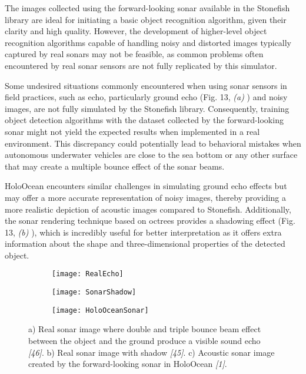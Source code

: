 \documentclass[]{article}
\begin{document}
	The images collected using the forward-looking sonar available in the Stonefish library are ideal for initiating a basic object recognition algorithm, given their clarity and high quality. However, the development of higher-level object recognition algorithms capable of handling noisy and distorted images typically captured by real sonars may not be feasible, as common problems often encountered by real sonar sensors are not fully replicated by this simulator.
	
	Some undesired situations commonly encountered when using sonar sensors in field practices, such as echo, particularly ground echo (Fig. 13, \textit{(a)} ) and noisy images, are not fully simulated by the Stonefish library. Consequently, training object detection algorithms with the dataset collected by the forward-looking sonar might not yield the expected results when implemented in a real environment. This discrepancy could potentially lead to behavioral mistakes when autonomous underwater vehicles are close to the sea bottom or any other surface that may create a multiple bounce effect of the sonar beams.
	
	HoloOcean encounters similar challenges in simulating ground echo effects but may offer a more accurate representation of noisy images, thereby providing a more realistic depiction of acoustic images compared to Stonefish. Additionally, the sonar rendering technique based on octrees provides a shadowing effect (Fig. 13, \textit{(b)} ), which is incredibly useful for better interpretation as it offers extra information about the shape and three-dimensional properties of the detected object.
	
	\begin{figure}
		\begin{subfigure}{.33\textwidth}
			\centering
			\texttt{[image: RealEcho]}
			\caption{}
		\end{subfigure}
		\begin{subfigure}{.305\textwidth}
			\centering
			\texttt{[image: SonarShadow]}
			\caption{}
		\end{subfigure}
		\begin{subfigure}{.4\textwidth}
			\centering
			\texttt{[image: HoloOceanSonar]}
			\caption{}
		\end{subfigure}
		\caption{a) Real sonar image where double and triple bounce beam effect between the object and the ground produce a visible sound echo \textit{[46]}. b) Real sonar image with shadow \textit{[45]}. c) Acoustic sonar image created by the forward-looking sonar in HoloOcean \textit{[1]}.}
	\end{figure}
	
\end{document}
